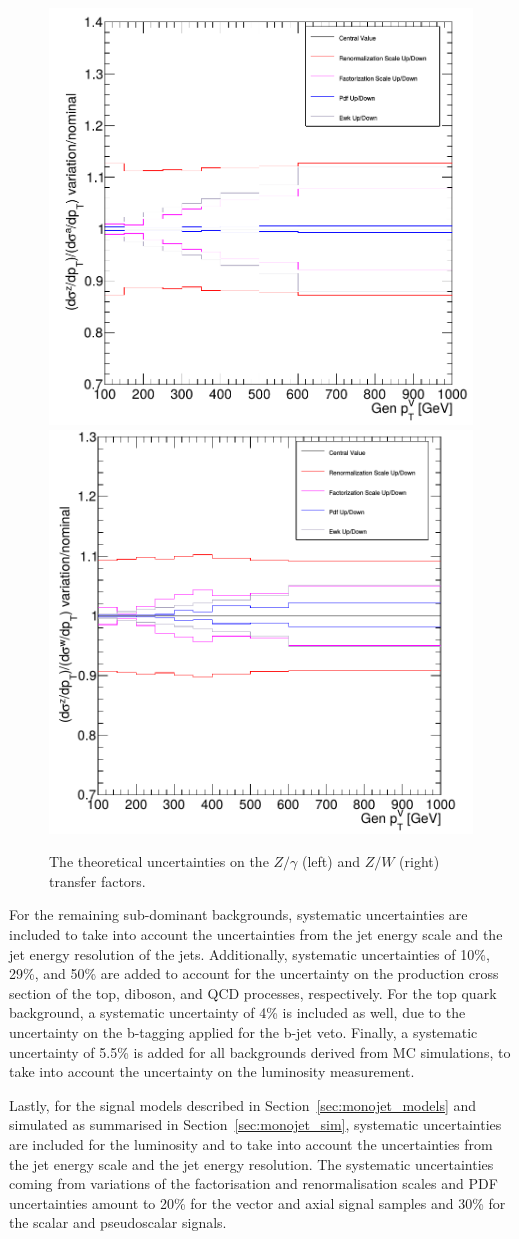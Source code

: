 \begin{figure}[ht]
  \centering
 \includegraphics[width=.49\textwidth]{syst1.png} 
 \includegraphics[width=.49\textwidth]{syst2.png}
 \caption{The theoretical uncertainties on the $Z/\gamma$ (left) and $Z/W$ (right) transfer factors.}
 \label{fig:transfer_factors_unc}
\end{figure}

For the remaining sub-dominant backgrounds, systematic uncertainties are included to take into account the uncertainties from the jet energy scale and the jet energy resolution of the jets. Additionally, systematic uncertainties  of 10\%, 29\%, and 50\% are added to account for the uncertainty on the production cross section of the top, diboson, and QCD processes, respectively. For the top quark background, a systematic uncertainty of 4\% is included as well, due to the uncertainty on the b-tagging applied for the b-jet veto. Finally, a systematic uncertainty of 5.5\% is added for all backgrounds derived from MC simulations, to take into account the uncertainty on the luminosity measurement.

Lastly, for the signal models described in Section~\ref{sec:monojet_models} and simulated as summarised in Section~\ref{sec:monojet_sim}, systematic uncertainties are included for the luminosity and to take into account the uncertainties from the jet energy scale and the jet energy resolution. The systematic uncertainties coming from variations of the factorisation and renormalisation scales and PDF uncertainties amount to 20\% for the vector and axial signal samples and 30\% for the scalar and pseudoscalar signals.

